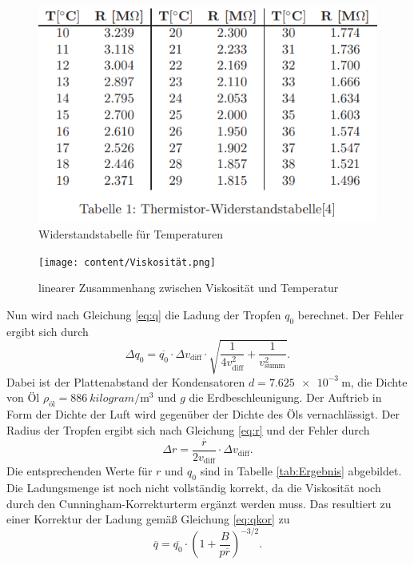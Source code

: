 \begin{figure}[H]
    \centering
    \includegraphics{content/Widerstand.png}
    \caption{Widerstandstabelle für Temperaturen}
    \label{fig:Wid}
  \end{figure}
  \begin{figure}[H]
    \centering
    \texttt{[image: content/Viskosität.png]}
    \caption{linearer Zusammenhang zwischen Viskosität und Temperatur}
    \label{fig:Vis}
  \end{figure}
Nun wird nach Gleichung \eqref{eq:q} die Ladung der Tropfen $q_0$ berechnet. Der Fehler ergibt sich durch
\begin{equation}
    \Delta q_0=\overline{q_0}\cdot \Delta v_\text{diff}\cdot \sqrt{\frac{1}{4v_\text{diff}^2}+\frac{1}{v_\text{summ}^2}}.
\end{equation}
Dabei ist der Plattenabstand der Kondensatoren $d=\qty{7.625e-3}{\meter}$, die Dichte von Öl 
$\rho_\text{öl}=\qty{886}{kilogram\per\meter\cubed}$ und $g$ die Erdbeschleunigung. Der Auftrieb in Form der Dichte der Luft
wird gegenüber der Dichte des Öls vernachlässigt.
Der Radius der Tropfen ergibt sich nach Gleichung \eqref{eq:r} und der Fehler durch
\begin{equation}
    \Delta r=\frac{\overline{r}}{2v_\text{diff}}\cdot \Delta v_\text{diff}.
\end{equation}
Die entsprechenden Werte für $r$ und $q_0$ sind in Tabelle \ref{tab:Ergebnis} abgebildet.
Die Ladungsmenge ist noch nicht vollständig korrekt, da die Viskosität noch durch den Cunningham-Korrekturterm
ergänzt werden muss. Das resultiert zu einer Korrektur der Ladung gemäß Gleichung \eqref{eq:qkor} zu
\begin{equation}
    \overline{q}=\overline{q_0}\cdot (1+\frac{B}{p\overline{r}})^{-3/2}.
\end{equation}
